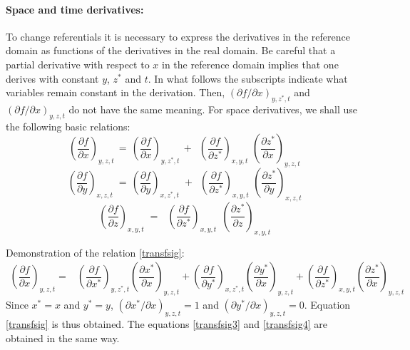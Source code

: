 \paragraph{Space and time derivatives:}
To change referentials it is necessary to express the derivatives in the reference domain
as functions of the derivatives in the real domain.
Be careful that a partial derivative with respect to $x$ in the reference domain
implies that one derives with constant $y$, $z^{\ast}$ and $t$.
In what follows the subscripts indicate what variables remain constant in the derivation.
Then, $(\partial f/\partial x)_{y,z^*,t}$ and $(\partial f/\partial x)_{y,z,t}$ do not have the same meaning.
For space derivatives, we shall use the following basic relations:%
\begin{equation}
\left(  \dfrac{\partial f}{\partial x}\right)  _{y,z,t}\,=\,\left(
\dfrac{\partial f}{\partial x}\right)  _{y,z^{\ast},t}\,+\,\,\,\left(
\dfrac{\partial f}{\partial z^{\ast}}\right)  _{x,y,t}\,\,\left(
\dfrac{\partial z^{\ast}}{\partial x}\right)  _{y,z,t}\, \label{transfsig}%
\end{equation}
%
\begin{equation}
\left(  \dfrac{\partial f}{\partial y}\right)  _{x,z,t\,}\,=\,\left(
\dfrac{\partial f}{\partial y}\right)  _{x,z^{\ast},t\,}\,+\,\,\,\left(
\dfrac{\partial f}{\partial z^{\ast}}\right)  _{x,y,t}\,\,\left(
\dfrac{\partial z^{\ast}}{\partial y}\right)  _{x,z,t\,} \label{transfsig3}%
\end{equation}
%
\begin{equation}
\left(  \dfrac{\partial f}{\partial z}\right)  _{x,y,t\,}\,=\,\,\,\,\left(
\dfrac{\partial f}{\partial z^{\ast}}\right)  _{x,y,t\,}\,\,\left(
\dfrac{\partial z^{\ast}}{\partial z}\right)  _{x,y,t\,} \label{transfsig4}%
\end{equation}

\begin{CommentBlock}{Demonstration of the relation \eqref{transfsig}:}
\begin{align*}
\left(\dfrac{\partial f}{\partial x}\right)_{y,z,t} = &
	\left(\dfrac{\partial f}{\partial x^*}\right)_{y,z^*,t} \left(\dfrac{\partial x^*}{\partial x}\right)_{y,z,t}
	+\left(\dfrac{\partial f}{\partial y^*}\right)_{x,z^*,t} \left(\dfrac{\partial y^*}{\partial x}\right)_{y,z,t}
	+\left(\dfrac{\partial f}{\partial z^*}\right)_{x,y,t}\left(\dfrac{\partial z^*}{\partial x}\right)_{y,z,t}
\end{align*}
Since $x^* = x$ and $y^* = y$, $\left(\partial x^*/\partial x\right)_{y,z,t}=1$
and  $\left(\partial y^*/\partial x\right)_{y,z,t}=0$. Equation \eqref{transfsig} is thus obtained.
The equations \eqref{transfsig3} and \eqref{transfsig4} are obtained in the same way.
\end{CommentBlock}

